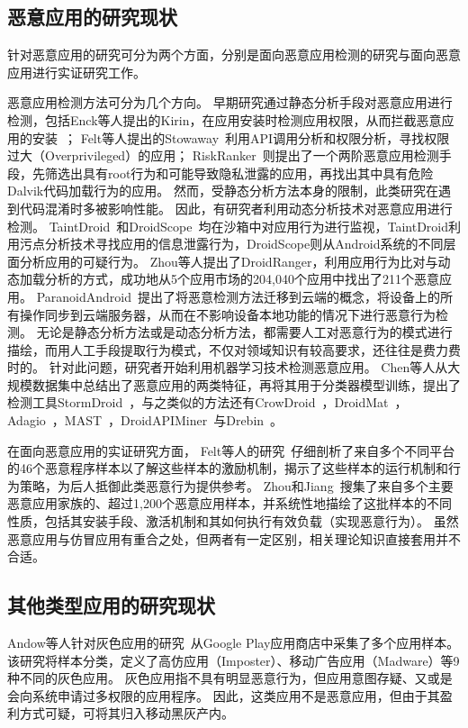 \subsection{恶意应用的研究现状}
针对恶意应用的研究可分为两个方面，分别是面向恶意应用检测的研究与面向恶意应用进行实证研究工作。

恶意应用检测方法可分为几个方向。
早期研究通过静态分析手段对恶意应用进行检测，包括Enck等人提出的Kirin，在应用安装时检测应用权限，从而拦截恶意应用的安装~\cite{enck2009lightweight}；
Felt等人提出的Stowaway~\cite{felt2011android}利用API调用分析和权限分析，寻找权限过大（Overprivileged）的应用；
RiskRanker~\cite{grace2012riskranker}则提出了一个两阶恶意应用检测手段，先筛选出具有root行为和可能导致隐私泄露的应用，再找出其中具有危险Dalvik代码加载行为的应用。
然而，受静态分析方法本身的限制，此类研究在遇到代码混淆时多被影响性能。
因此，有研究者利用动态分析技术对恶意应用进行检测。
TaintDroid~\cite{enck2014taintdroid}和DroidScope~\cite{yan2012droidscope}均在沙箱中对应用行为进行监视，TaintDroid利用污点分析技术寻找应用的信息泄露行为，DroidScope则从Android系统的不同层面分析应用的可疑行为。
Zhou等人\cite{zhou2012hey}提出了DroidRanger，利用应用行为比对与动态加载分析的方式，成功地从5个应用市场的204,040个应用中找出了211个恶意应用。
ParanoidAndroid~\cite{portokalidis2010paranoid}提出了将恶意检测方法迁移到云端的概念，将设备上的所有操作同步到云端服务器，从而在不影响设备本地功能的情况下进行恶意行为检测。
无论是静态分析方法或是动态分析方法，都需要人工对恶意行为的模式进行描绘，而用人工手段提取行为模式，不仅对领域知识有较高要求，还往往是费力费时的。
针对此问题，研究者开始利用机器学习技术检测恶意应用。
Chen等人从大规模数据集中总结出了恶意应用的两类特征，再将其用于分类器模型训练，提出了检测工具StormDroid~\cite{chen2016stormdroid}，与之类似的方法还有CrowDroid~\cite{burguera2011crowdroid}，DroidMat~\cite{wu2012droidmat}，Adagio~\cite{gascon2013structural}，MAST~\cite{chakradeo2013mast}，DroidAPIMiner~\cite{aafer2013droidapiminer}与Drebin~\cite{arp2014drebin}。

在面向恶意应用的实证研究方面，
Felt等人的研究~\cite{Felt2011ASO}仔细剖析了来自多个不同平台的46个恶意程序样本以了解这些样本的激励机制，揭示了这些样本的运行机制和行为策略，为后人抵御此类恶意行为提供参考。
Zhou和Jiang~\cite{Zhou2012DissectingAM}搜集了来自多个主要恶意应用家族的、超过1,200个恶意应用样本，并系统性地描绘了这批样本的不同性质，包括其安装手段、激活机制和其如何执行有效负载（实现恶意行为）。
虽然恶意应用与仿冒应用有重合之处，但两者有一定区别，相关理论知识直接套用并不合适。

\subsection{其他类型应用的研究现状}
Andow等人针对灰色应用的研究~\cite{Andow2016ASO}从Google Play应用商店中采集了多个应用样本。
该研究将样本分类，定义了高仿应用（Imposter）、移动广告应用（Madware）等9种不同的灰色应用。
灰色应用指不具有明显恶意行为，但应用意图存疑、又或是会向系统申请过多权限的应用程序。
因此，这类应用不是恶意应用，但由于其盈利方式可疑，可将其归入移动黑灰产内。

